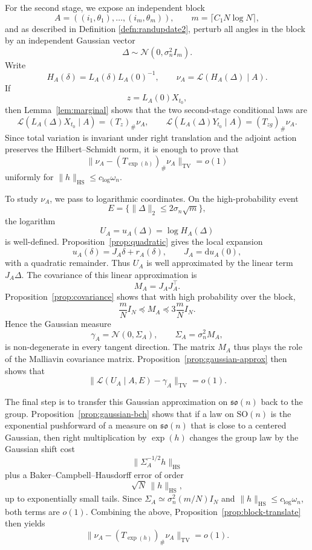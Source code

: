 \documentclass[11pt, reqno]{amsart}
\numberwithin{equation}{section}
\theoremstyle{remark}
\newcommand{\1}{\mathbf{1}}
\newcommand{\SO}{\mathrm{SO}}
\newcommand{\so}{\mathfrak{so}}
\newcommand{\HS}{\mathrm{HS}}
\newcommand{\Law}{\mathcal{L}}
\newcommand{\TV}{\mathrm{TV}}
\newcommand{\dd}{\mathrm{d}}
\begin{document}
For the second stage, we expose an independent block
\[
A=((i_1,\theta_1),\dots,(i_m,\theta_m)),
\qquad
m=\lceil C_1N\log N\rceil,
\]
and as described in Definition \ref{defn:randupdate2}, perturb all angles in the block by an independent Gaussian vector
\[
\Delta\sim\mathcal N(0,\sigma_n^2I_m).
\]
Write
\[
H_A(\delta)=L_A(\delta)L_A(0)^{-1},
\qquad
\nu_A=\Law(H_A(\Delta)\mid A).
\]
If
\[
z=L_A(0)X_{t_0},
\]
then Lemma~\ref{lem:marginal} shows that the two second-stage conditional laws are
\[
\Law(L_A(\Delta)X_{t_0}\mid A)=(T_z)_\#\nu_A,
\qquad
\Law(L_A(\Delta)Y_{t_0}\mid A)=(T_{zg})_\#\nu_A.
\]
Since total variation is invariant under right translation and the adjoint action
preserves the Hilbert--Schmidt norm, it is enough to prove that
\[
\|\nu_A-(T_{\exp(h)})_\#\nu_A\|_{\TV}=o(1)
\]
uniformly for $\|h\|_{\HS}\le c_{\log}\omega_n$.

To study \(\nu_A\), we pass to logarithmic coordinates. On the high-probability
event
\[
E=\{\|\Delta\|_2\le 2\sigma_n\sqrt m\},
\]
the logarithm
\[
U_A=u_A(\Delta)=\log H_A(\Delta)
\]
is well-defined. Proposition~\ref{prop:quadratic} gives the local expansion
\[
u_A(\delta)=J_A\delta+r_A(\delta),
\qquad
J_A=\dd u_A(0),
\]
with a quadratic remainder. Thus \(U_A\) is well approximated by the linear term
\(J_A\Delta\). The covariance of this linear approximation is
\[
M_A=J_AJ_A^\top.
\]
Proposition~\ref{prop:covariance} shows that with high probability over the block,
\[
\frac{m}{N}I_N\preceq M_A\preceq 3\frac{m}{N}I_N.
\]
Hence the Gaussian measure
\[
\gamma_A=\mathcal N(0,\Sigma_A),
\qquad
\Sigma_A=\sigma_n^2M_A,
\]
is non-degenerate in every tangent direction. The matrix $M_A$ thus plays the role of the Malliavin covariance matrix. Proposition~\ref{prop:gaussian-approx}
then shows that
\[
\|\Law(U_A\mid A,E)-\gamma_A\|_{\TV}=o(1).
\]

The final step is to transfer this Gaussian approximation on $\so(n)$ back to the group.
Proposition~\ref{prop:gaussian-bch} shows that if a law on \(\SO(n)\) is the
exponential pushforward of a measure on \(\so(n)\) that is close to a centered
Gaussian, then right multiplication by \(\exp(h)\) changes the group law by the
Gaussian shift cost
\[
\|\Sigma_A^{-1/2}h\|_{\HS}
\]
plus a Baker--Campbell--Hausdorff error of order
\[
\sqrt N\,\|h\|_{\HS},
\]
up to exponentially small tails. Since \(\Sigma_A\simeq \sigma_n^2(m/N)I_N\) and \(\|h\|_{\HS}\le c_{\log}\omega_n\), both terms are \(o(1)\).
Combining the above, Proposition~\ref{prop:block-translate} then yields
\[
\|\nu_A-(T_{\exp(h)})_\#\nu_A\|_{\TV}=o(1).
\]
\end{document}
